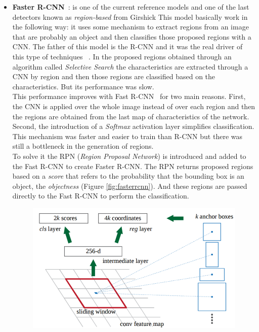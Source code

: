 \begin{itemize}
    \item \textbf{Faster R-CNN}~\cite{ren2015faster}: is one of the current reference models and one of the last detectors known as  \textit{region-based} from Girshick \etal{}This model basically work in the following way: it uses some mechanism to extract regions from an image that are probably an object and then classifies those proposed regions with a CNN. The father of this model is the R-CNN and it was the real driver of this type of techniques ~\cite{girshick2014rich}. In the proposed regions obtained through an algorithm called \textit{Selective Search} the characteristics are extracted through a CNN by region and then those regions are classified based on the characteristics. But its performance was slow.\\
    This performance improves with Fast R-CNN~\cite{girshick2015fast} for two main reasons. First, the CNN is applied over the whole image instead of over each region and then the regions are obtained from the last map of characteristics of the network. Second, the introduction of a \textit{Softmax} activation layer simplifies classification. This mechanism was faster and easier to train than R-CNN but there was still a bottleneck in the generation of regions.\\
    To solve it the RPN (\textit{Region Proposal Network}) is introduced and added to the Fast R-CNN to create Faster R-CNN. The RPN returns proposed regions based on a \textit{score} that refers to the probability that the bounding box is an object, the \textit{objectness} (Figure \ref{fig:fasterrcnn}). And these regions are passed directly to the Fast R-CNN to perform the classification.\\
    \begin{figure}[H]
    \begin{center}
    \includegraphics[scale=0.3]{previous_version/faster_rcnn.png}

\end{center}
\end{figure}
\end{itemize}
